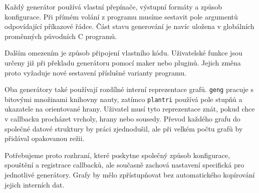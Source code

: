 Každý generátor používá vlastní přepínače, výstupní formáty a způsob konfigurace.
Při přímém volání z programu musíme sestavit pole argumentů odpovídající
příkazové řádce. Část stavu generování je navíc uložena v globálních
proměnných původních C programů.

Dalším omezením je způsob připojení vlastního kódu. Uživatelské funkce jsou
určeny již při překladu generátoru pomocí maker nebo pluginů. Jejich změna
proto vyžaduje nové sestavení příslušné varianty programu.

Oba generátory také používají rozdílné interní reprezentace grafů.
\texttt{geng} pracuje s bitovými množinami knihovny nauty, zatímco
\texttt{plantri} používá pole stupňů a ukazatele na orientované hrany.
Uživatel musí tyto reprezentace znát, pokud chce v callbacku procházet vrcholy,
hrany nebo sousedy. Převod každého grafu do společné datové struktury by práci
zjednodušil, ale při velkém počtu grafů by přidával opakovanou režii.

Potřebujeme proto rozhraní, které poskytne společný způsob konfigurace,
spouštění a registrace callbacků, ale současně zachová nastavení specifická
pro jednotlivé generátory. Grafy by mělo zpřístupňovat bez automatického
kopírování jejich interních dat.